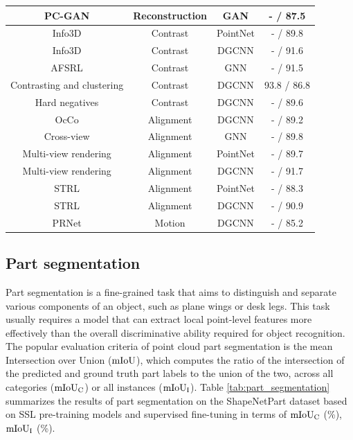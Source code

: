 \documentclass[a4paper,fleqn]{cas-dc}
\begin{document}
\begin{table}[]
{\begin{tabular}{cccc}
    PC-GAN \citep{li2018point} & Reconstruction & GAN & - / 87.5 \\
    \midrule
    Info3D \citep{sanghi2020info3d} & Contrast & PointNet & - / 89.8 \\
    Info3D \citep{sanghi2020info3d} & Contrast & DGCNN & - / 91.6 \\
    AFSRL \citep{lu2022joint} & Contrast & GNN & - / 91.5 \\
    Contrasting and clustering \citep{zhang2019unsupervised} & Contrast & DGCNN & 93.8 / 86.8 \\
    Hard negatives \citep{du2021self} & Contrast & DGCNN & - / 89.6 \\
    \midrule
    OcCo \citep{wang2021unsupervised} & Alignment & DGCNN & - / 89.2 \\
    Cross-view \citep{jing2021self} & Alignment & GNN & - / 89.8 \\
    Multi-view rendering \citep{tran2022self} & Alignment & PointNet & - / 89.7 \\
    Multi-view rendering \citep{tran2022self} & Alignment & DGCNN & - / 91.7 \\
    STRL \citep{huang2021spatio} & Alignment & PointNet & - / 88.3 \\
    STRL \citep{huang2021spatio} & Alignment & DGCNN & - / 90.9 \\
    \midrule
    PRNet \citep{wang2019prnet} & Motion & DGCNN & - / 85.2 \\
    \bottomrule
    \end{tabular}}

\end{table}


\subsection{Part segmentation}
Part segmentation is a fine-grained task that aims to distinguish and separate various components of an object, such as plane wings or desk legs. This task usually requires a model that can extract local point-level features more effectively than the overall discriminative ability required for object recognition. The popular evaluation criteria of point cloud part segmentation is the mean Intersection over Union ($\rm mIoU$), which computes the ratio of the intersection of the predicted and ground truth part labels to the union of the two, across all categories ($\rm mIoU_{C}$) or all instances ($\rm mIoU_{I}$). Table \ref{tab:part_segmentation} summarizes the results of part segmentation on the ShapeNetPart dataset based on SSL pre-training models and supervised fine-tuning in terms of $\rm mIoU_{C}$ (\%), $\rm mIoU_{I}$ (\%).
\end{document}
